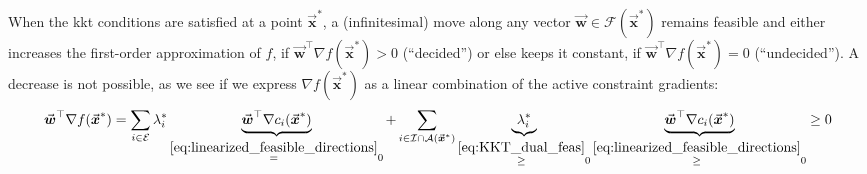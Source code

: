 \documentclass[9pt, headings=standardclasses, parskip=half]{scrartcl}
\newcommand{\vect}[1]{\vec{\boldsymbol{#1}}}
\begin{document}
When the \gls{kkt} conditions are satisfied at a point \(\vect{x}^{\ast}\), a (infinitesimal) move along any vector \(\vect{w} \in \mathcal{F}(\vect{x}^{\ast})\) remains feasible and either increases the first-order approximation of \(f\), if \(\vect{w}^\top \nabla f(\vect{x}^{\ast}) > 0\) (``decided'') or else keeps it constant, if \(\vect{w}^\top \nabla f(\vect{x}^{\ast}) = 0\) (``undecided'').
A decrease is not possible, as we see if we express \(\nabla f(\vect{x}^{\ast})\) as a linear combination of the active constraint gradients:
\begin{equation}\label{eq:KKT_objective_gradient}
\vect{w}^{\top}\nabla f(\vect{x}^{\ast})
=
\sum_{i\in\mathcal{E}}
\lambda_i^{\ast}
\underbrace{\vect{w}^{\top} \nabla c_i(\vect{x}^{\ast})}_{\overset{\eqref{eq:linearized_feasible_directions}}{=} 0}
+
\sum_{i\in\mathcal{I}\cap\mathcal{A}(\vect{x}^{\ast})} 
\underbrace{\lambda_i^{\ast}}_{\overset{\eqref{eq:KKT_dual_feas}}{\ge} 0}
\underbrace{\vect{w}^{\top}\nabla c_i(\vect{x}^{\ast})}_{\overset{\eqref{eq:linearized_feasible_directions}}{\ge} 0}
\ge 0
\end{equation}
\end{document}
